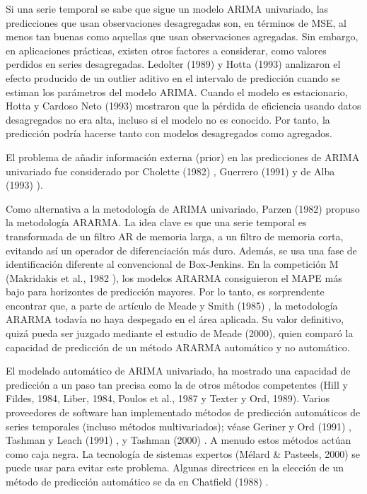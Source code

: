 \documentclass{llncs}
\begin{document}
Si una serie temporal se sabe que sigue un modelo ARIMA univariado, las predicciones que usan observaciones desagregadas son, en términos de MSE, al menos tan buenas como aquellas que usan observaciones agregadas. Sin embargo, en aplicaciones prácticas, existen otros factores a considerar, como valores perdidos en series desagregadas. Ledolter (1989) \cite{Ledolter1989231} y Hotta (1993) \cite{Hotta1993261} analizaron el efecto producido de un outlier aditivo en el intervalo de predicción cuando se estiman los parámetros del modelo ARIMA. Cuando el modelo es estacionario, Hotta y Cardoso Neto (1993) mostraron que la pérdida de eficiencia usando datos desagregados no era alta, incluso si el modelo no es conocido. Por tanto, la predicción podría hacerse tanto con modelos desagregados como agregados.

El problema de añadir información externa (prior) en las predicciones de ARIMA univariado fue considerado por Cholette (1982) \cite{Cholette1982375}, Guerrero (1991) \cite{Guerrero1991339} y de Alba (1993) \cite{deAlba199395}).

Como alternativa a la metodología de ARIMA univariado, Parzen (1982) \cite{Parzen198267} propuso la metodología ARARMA. La idea clave es que una serie temporal es transformada de un filtro AR de memoria larga, a un filtro de memoria corta, evitando así un operador de diferenciación más duro. Además, se usa una fase de identificación diferente al convencional de Box-Jenkins. En la competición M (Makridakis et al., 1982 \cite{Makridakis1982111}), los modelos ARARMA consiguieron el MAPE más bajo para horizontes de predicción mayores. Por lo tanto, es sorprendente encontrar que, a parte de artículo de Meade y Smith (1985) \cite{-}, la metodología ARARMA todavía no haya despegado en el área aplicada. Su valor definitivo, quizá pueda ser juzgado mediante el estudio  de Meade (2000), quien comparó la capacidad de predicción de un método ARARMA automático y no automático.

El modelado automático de ARIMA univariado, ha mostrado una capacidad de predicción a un paso tan precisa como la de otros métodos competentes (Hill y Fildes, 1984, Liber, 1984, Poulos et al., 1987 y Texter y Ord, 1989). Varios proveedores de software han implementado métodos de predicción automáticos de series temporales (incluso métodos multivariados); véase Geriner y Ord (1991) \cite{Geriner1991127}, Tashman y Leach (1991) \cite{-}, y Tashman (2000) \cite{-}. A menudo estos métodos actúan como caja negra. La tecnología de sistemas expertos (Mélard \& Pasteels, 2000) se puede usar para evitar este problema. Algunas directrices en la elección de un método de predicción automático se da en Chatfield (1988) \cite{Chatfield198819}.
\end{document}
